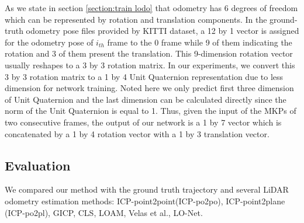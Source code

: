 \documentclass[sigconf]{acmart}
\begin{document}
As we state in section \ref{section:train lodo} that odometry has 6 degrees of freedom which can be represented by rotation and translation components. In the ground-truth odometry pose files provided by KITTI dataset, a 12 by 1 vector is assigned for the odometry pose of $i_{th}$ frame to the 0 frame while 9 of them indicating the rotation and 3 of them present the translation. This 9-dimension rotation vector usually reshapes to a 3 by 3 rotation matrix. In our experiments, we convert this 3 by 3 rotation matrix to a 1 by 4 Unit Quaternion representation due to less dimension for network training. Noted here we only predict first three dimension of Unit Quaternion and the last dimension can be calculated directly since the norm of the Unit Quaternion is equal to 1. Thus, given the input of the MKPs of two consecutive frames, the output of our network is a 1 by 7 vector which is concatenated by a 1 by 4 rotation vector with a 1 by 3 translation vector.

\subsection{Evaluation}
We compared our method with the ground truth trajectory and several LiDAR odometry estimation methods: ICP-point2point(ICP-po2po), ICP-point2plane (ICP-po2pl), GICP\cite{GICP}, CLS\cite{CLS}, LOAM\cite{LOAM}, Velas et al.\cite{Velas}, LO-Net\cite{LO-Net}.
\end{document}
